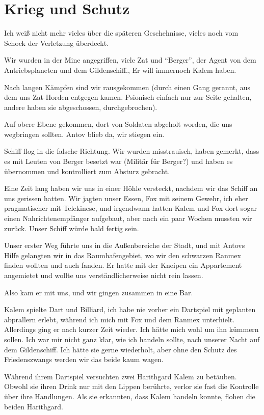 \documentclass[11pt]{article}
\begin{document}
\section{Krieg und Schutz}

Ich weiß nicht mehr vieles über die späteren Geschehnisse, vieles noch
vom Schock der Verletzung überdeckt.

Wir wurden in der Mine angegriffen, viele Zat und ``Berger'', der Agent
von dem Antriebsplaneten und dem Gildenschiff., Er will immernoch Kalem
haben.

Nach langen Kämpfen sind wir rausgekommen (durch einen Gang gerannt, aus
dem uns Zat-Horden entgegen kamen. Psionisch einfach nur zur Seite
gehalten, andere haben sie abgeschossen, durchgebrochen).

Auf obere Ebene gekommen, dort von Soldaten abgeholt worden, die uns
wegbringen sollten. Antov blieb da, wir stiegen ein.

Schiff flog in die falsche Richtung. Wir wurden misstrauisch, haben
gemerkt, dass es mit Leuten von Berger besetzt war (Militär für Berger?)
und haben es übernommen und kontrolliert zum Absturz gebracht.

Eine Zeit lang haben wir uns in einer Höhle versteckt, nachdem wir das
Schiff an uns gerissen hatten. Wir jagten unser Essen, Fox mit seinem
Gewehr, ich eher pragmatischer mit Telekinese, und irgendwann hatten
Kalem und Fox dort sogar einen Nahrichtenempfänger aufgebaut, aber nach
ein paar Wochen mussten wir zurück. Unser Schiff würde bald fertig sein.

Unser erster Weg führte uns in die Außenbereiche der Stadt, und mit
Antovs Hilfe gelangten wir in das Raumhafengebiet, wo wir den schwarzen
Ranmex finden wollten und auch fanden. Er hatte mit der Kneipen ein
Appartement angemietet und wollte uns verständlicherweise nicht rein
lassen.

Also kam er mit uns, und wir gingen zusammen in eine Bar.

Kalem spielte Dart und Billiard, ich habe nie vorher ein Dartspiel mit
geplanten abprallern erlebt, während ich mich mit Fox und dem Ranmex
unterhielt. Allerdings ging er nach kurzer Zeit wieder. Ich hätte mich
wohl um ihn kümmern sollen. Ich war mir nicht ganz klar, wie ich handeln
sollte, nach unserer Nacht auf dem Gildenschiff. Ich hätte sie gerne
wiederholt, aber ohne den Schutz des Friedenszwangs werden wir das beide
kaum wagen.

Während ihrem Dartspiel versuchten zwei Harithgard Kalem zu betäuben.
Obwohl sie ihren Drink nur mit den Lippen berührte, verlor sie fast die
Kontrolle über ihre Handlungen. Als sie erkannten, dass Kalem handeln
konnte, flohen die beiden Harithgard.
\end{document}
